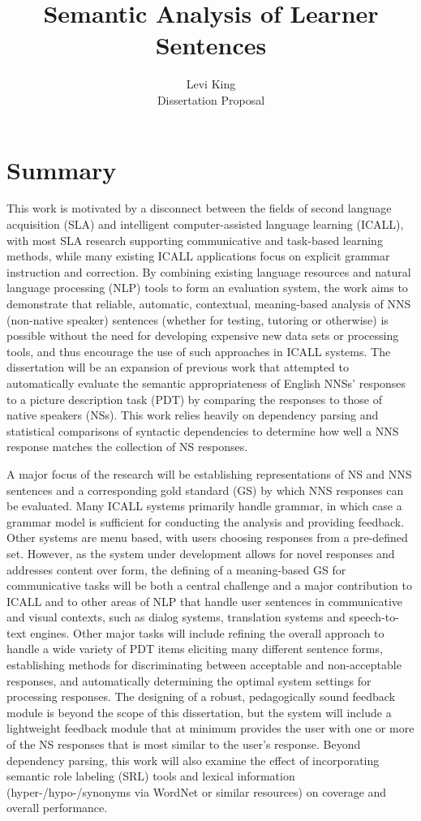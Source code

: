 \documentclass[11pt]{article}
\title{Semantic Analysis of Learner Sentences}
\author{Levi King \\ Dissertation Proposal}
\begin{document}
\maketitle

\section{Summary}
This work is motivated by a disconnect between the fields of second language acquisition (SLA) and intelligent computer-assisted language learning (ICALL), with most SLA research supporting communicative and task-based learning methods, while many existing ICALL applications focus on explicit grammar instruction and correction. By combining existing language resources and natural language processing (NLP) tools to form an evaluation system, the work aims to demonstrate that reliable, automatic, contextual, meaning-based analysis of NNS (non-native speaker) sentences (whether for testing, tutoring or otherwise) is possible without the need for developing expensive new data sets or processing tools, and thus encourage the use of such approaches in ICALL systems. The dissertation will be an expansion of previous work that attempted to automatically evaluate the semantic appropriateness of English NNSs' responses to a picture description task (PDT) by comparing the responses to those of native speakers (NSs). This work relies heavily on dependency parsing and statistical comparisons of syntactic dependencies to determine how well a NNS response matches the collection of NS responses. 
\par A major focus of the research will be establishing representations of NS and NNS sentences and a corresponding gold standard (GS) by which NNS responses can be evaluated. Many ICALL systems primarily handle grammar, in which case a grammar model is sufficient for conducting the analysis and providing feedback. Other systems are menu based, with users choosing responses from a pre-defined set. However, as the system under development allows for novel responses and addresses content over form, the defining of a meaning-based GS for communicative tasks will be both a central challenge and a major contribution to ICALL and to other areas of NLP that handle user sentences in communicative and visual contexts, such as dialog systems, translation systems and speech-to-text engines. Other major tasks will include refining the overall approach to handle a wide variety of PDT items eliciting many different sentence forms, establishing methods for discriminating between acceptable and non-acceptable responses, and automatically determining the optimal system settings for processing responses. The designing of a robust, pedagogically sound feedback module is beyond the scope of this dissertation, but the system will include a lightweight feedback module that at minimum provides the user with one or more of the NS responses that is most similar to the user's response. Beyond dependency parsing, this work will also examine the effect of incorporating semantic role labeling (SRL) tools and lexical information (hyper-/hypo-/synonyms via WordNet or similar resources) on coverage and overall performance.\\
\end{document}
